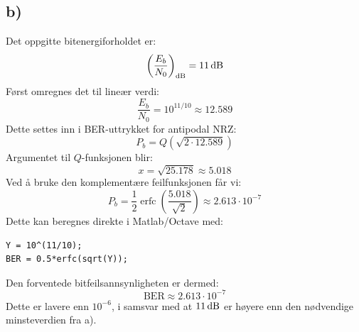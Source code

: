 \subsection*{b)}
Det oppgitte bitenergiforholdet er:
\[
    \left(\frac{E_b}{N_0}\right)_{\mathrm{dB}}=11\,\mathrm{dB}
\]
Først omregnes det til lineær verdi:
\[
    \frac{E_b}{N_0}=10^{11/10}\approx12.589
\]
Dette settes inn i BER-uttrykket for antipodal NRZ:
\[
    P_b=Q\!\left(\sqrt{2\cdot12.589}\right)
\]
Argumentet til $Q$-funksjonen blir:
\[
    x=\sqrt{25.178}\approx5.018
\]
Ved å bruke den komplementære feilfunksjonen får vi:
\[
    P_b=\frac{1}{2}\operatorname{erfc}\!\left(    \frac{5.018}{\sqrt{2}}\right)
       \approx2.613\cdot10^{-7}
\]
Dette kan beregnes direkte i Matlab/Octave med:
\begin{verbatim}
Y = 10^(11/10);
BER = 0.5*erfc(sqrt(Y));
\end{verbatim}
Den forventede bitfeilsannsynligheten er dermed:
\[
    \boxed{\mathrm{BER}\approx2.613\cdot10^{-7}}
\]
Dette er lavere enn $10^{-6}$, i samsvar med at $11\,\mathrm{dB}$ er høyere enn den nødvendige minsteverdien fra a).
